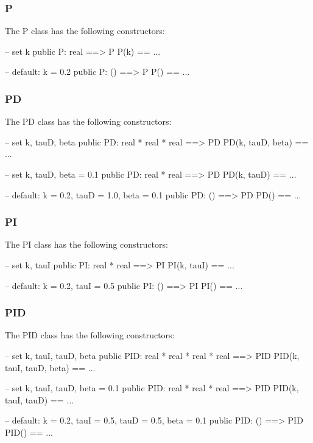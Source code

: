 \documentclass{crescendorepchap}
\begin{document}
\subsubsection{P}

The P class has the following constructors:

\begin{vdmrt}
-- set k
public P: real ==> P
P(k) == ...

-- default: k = 0.2
public P: () ==> P
P() == ...
\end{vdmrt}

\subsubsection{PD}

The PD class has the following constructors:

\begin{vdmrt}
-- set k, tauD, beta
public PD: real * real * real ==> PD
PD(k, tauD, beta) == ...

-- set k, tauD, beta = 0.1
public PD: real * real ==> PD
PD(k, tauD) == ...

-- default: k = 0.2, tauD = 1.0, beta = 0.1
public PD: () ==> PD
PD() == ...
\end{vdmrt}

\subsubsection{PI}

The PI class has the following constructors:

\begin{vdmrt}
-- set k, tauI
public PI: real * real ==> PI
PI(k, tauI) == ...

-- default: k = 0.2, tauI = 0.5
public PI: () ==> PI
PI() == ...
\end{vdmrt}

\subsubsection{PID}

The PID class has the following constructors:

\begin{vdmrt}
-- set k, tauI, tauD, beta
public PID: real * real * real * real ==> PID
PID(k, tauI, tauD, beta) == ...

-- set k, tauI, tauD, beta = 0.1
public PID: real * real * real ==> PID
PID(k, tauI, tauD) == ...

-- default: k = 0.2, tauI = 0.5, tauD = 0.5, beta = 0.1
public PID: () ==> PID
PID() == ...
\end{vdmrt}
\end{document}
